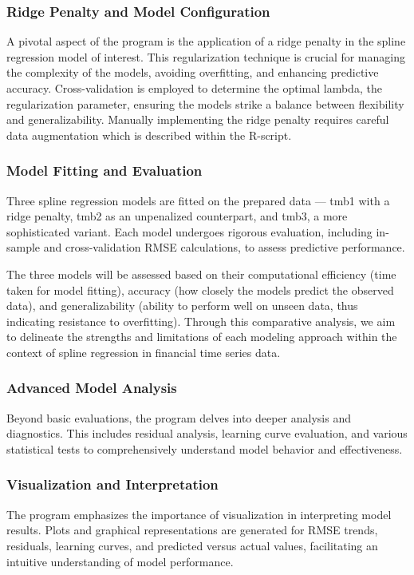 \documentclass[12pt, twoside,hidelinks]{article}
\theoremstyle{definition}
\numberwithin{equation}{section}
\begin{document}
\subsubsection*{Ridge Penalty and Model Configuration}
A pivotal aspect of the program is the application of a ridge penalty in the spline regression model of interest. This regularization technique is crucial for managing the complexity of the models, avoiding overfitting, and enhancing predictive accuracy. Cross-validation is employed to determine the optimal lambda, the regularization parameter, ensuring the models strike a balance between flexibility and generalizability. Manually implementing the ridge penalty requires careful data augmentation which is described within the R-script. 

\subsubsection*{Model Fitting and Evaluation}
Three spline regression models are fitted on the prepared data — tmb1 with a ridge penalty, tmb2 as an unpenalized counterpart, and tmb3, a more sophisticated variant. Each model undergoes rigorous evaluation, including in-sample and cross-validation RMSE calculations, to assess predictive performance.
\newline

The three models will be assessed based on their computational efficiency (time taken for model fitting), accuracy (how closely the models predict the observed data), and generalizability (ability to perform well on unseen data, thus indicating resistance to overfitting). Through this comparative analysis, we aim to delineate the strengths and limitations of each modeling approach within the context of spline regression in financial time series data.


\subsubsection*{Advanced Model Analysis}
Beyond basic evaluations, the program delves into deeper analysis and diagnostics. This includes residual analysis, learning curve evaluation, and various statistical tests to comprehensively understand model behavior and effectiveness.


\subsubsection*{Visualization and Interpretation}
The program emphasizes the importance of visualization in interpreting model results. Plots and graphical representations are generated for RMSE trends, residuals, learning curves, and predicted versus actual values, facilitating an intuitive understanding of model performance.
\end{document}

